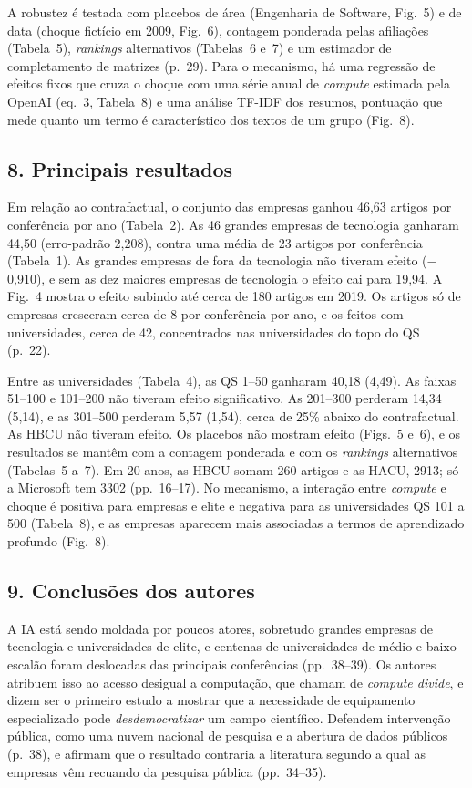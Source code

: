 A robustez é testada com placebos de área (Engenharia de Software, Fig.~5) e de data (choque
fictício em 2009, Fig.~6), contagem ponderada pelas afiliações (Tabela~5), \emph{rankings}
alternativos (Tabelas~6 e~7) e um estimador de completamento de matrizes (p.~29). Para o mecanismo,
há uma regressão de efeitos fixos que cruza o choque com uma série anual de \emph{compute} estimada
pela OpenAI (eq.~3, Tabela~8) e uma análise TF-IDF dos resumos, pontuação que mede quanto um termo
é característico dos textos de um grupo (Fig.~8).

\subsection*{8. Principais resultados}
Em relação ao contrafactual, o conjunto das empresas ganhou 46,63 artigos por conferência por ano
(Tabela~2). As 46 grandes empresas de tecnologia ganharam 44,50 (erro-padrão 2,208), contra uma
média de 23 artigos por conferência (Tabela~1). As grandes empresas de fora da tecnologia não
tiveram efeito ($-$0,910), e sem as dez maiores empresas de tecnologia o efeito cai para 19,94. A
Fig.~4 mostra o efeito subindo até cerca de 180 artigos em 2019. Os artigos só de empresas
cresceram cerca de 8 por conferência por ano, e os feitos com universidades, cerca de 42,
concentrados nas universidades do topo do QS (p.~22).

Entre as universidades (Tabela~4), as QS 1--50 ganharam 40,18 (4,49). As faixas 51--100 e
101--200 não tiveram efeito significativo. As 201--300 perderam 14,34 (5,14), e as 301--500
perderam 5,57 (1,54), cerca de 25\% abaixo do contrafactual. As HBCU não tiveram efeito. Os
placebos não mostram efeito (Figs.~5 e~6), e os resultados se mantêm com a contagem ponderada e com
os \emph{rankings} alternativos (Tabelas~5 a~7). Em 20 anos, as HBCU somam 260 artigos e as HACU,
2913; só a Microsoft tem 3302 (pp.~16--17). No mecanismo, a interação entre \emph{compute} e choque é
positiva para empresas e elite e negativa para as universidades QS 101 a 500 (Tabela~8), e as
empresas aparecem mais associadas a termos de aprendizado profundo (Fig.~8).

\subsection*{9. Conclusões dos autores}
A IA está sendo moldada por poucos atores, sobretudo grandes empresas de tecnologia e
universidades de elite, e centenas de universidades de médio e baixo escalão foram deslocadas das
principais conferências (pp.~38--39). Os autores atribuem isso ao acesso desigual a computação, que
chamam de \emph{compute divide}, e dizem ser o primeiro estudo a mostrar que a necessidade de
equipamento especializado pode \emph{desdemocratizar} um campo científico. Defendem intervenção
pública, como uma nuvem nacional de pesquisa e a abertura de dados públicos (p.~38), e afirmam que
o resultado contraria a literatura segundo a qual as empresas vêm recuando da pesquisa pública
(pp.~34--35).


